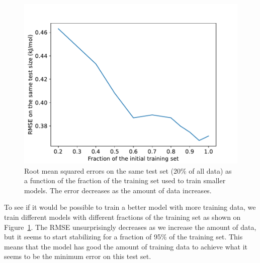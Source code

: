 \documentclass[main]{subfiles}
\begin{document}
\begin{figure}[ht]
  \centering
    \includegraphics[width=0.5\linewidth]{figures/4-ml/main/training_curve.pdf}
    \caption{ Root mean squared errors on the same test set (20\% of all data) as a function of the fraction of the training set used to train smaller models. The error decreases as the amount of data increases. }\label{fgr:training_curve}
  \end{figure}

To see if it would be possible to train a better model with more training data, we train different models with different fractions of the training set as shown on Figure~\ref{fgr:training_curve}. The RMSE unsurprisingly decreases as we increase the amount of data, but it seems to start stabilizing for a fraction of 95\% of the training set. This means that the model has good the amount of training data to achieve what it seems to be the minimum error on this test set.
\end{document}
